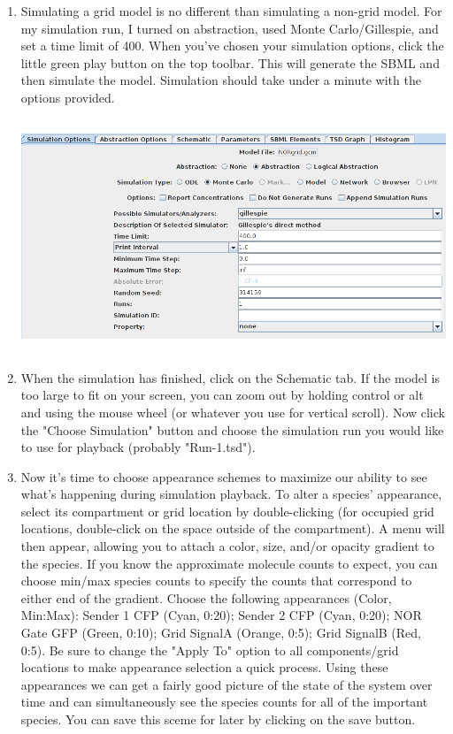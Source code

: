 \documentclass[titlepage,11pt]{article}
\begin{document}
\begin{enumerate}

\item Simulating a grid model is no different than simulating a non-grid model.  For my simulation run, I turned on abstraction, used Monte Carlo/Gillespie, and set a time limit of 400.  When you've chosen your simulation options, click the little green play button on the top toolbar.  This will generate the SBML and then simulate the model.  Simulation should take under a minute with the options provided.

\includegraphics[height=70mm]{screenshots/grid_sim_options}

\item When the simulation has finished, click on the Schematic tab.  If the model is too large to fit on your screen, you can zoom out by holding control or alt and using the mouse wheel (or whatever you use for vertical scroll).  Now click the "Choose Simulation" button and choose the simulation run you would like to use for playback (probably "Run-1.tsd").

\item Now it's time to choose appearance schemes to maximize our ability to see what's happening during simulation playback.  To alter a species' appearance, select its compartment or grid location by double-clicking (for occupied grid locations, double-click on the space outside of the compartment).  A menu will then appear, allowing you to attach a color, size, and/or opacity gradient to the species.  If you know the approximate molecule counts to expect, you can choose min/max species counts to specify the counts that correspond to either end of the gradient.  Choose the following appearances (Color, Min:Max): Sender 1 CFP (Cyan, 0:20); Sender 2 CFP (Cyan, 0:20); NOR Gate GFP (Green, 0:10); Grid SignalA (Orange, 0:5); Grid SignalB (Red, 0:5).  Be sure to change the "Apply To" option to all components/grid locations to make appearance selection a quick process.  Using these appearances we can get a fairly good picture of the state of the system over time and can simultaneously see the species counts for all of the important species.  You can save this sceme for later by clicking on the save button.


\end{enumerate}
\end{document}

